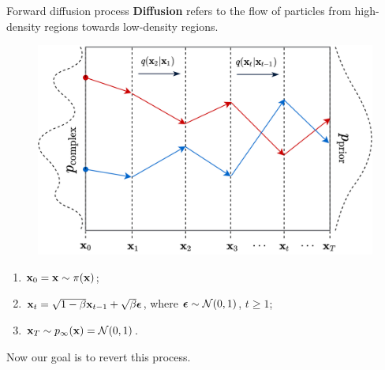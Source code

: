 \begin{frame}{Forward diffusion process}
	\textbf{Diffusion} refers to the flow of particles from high-density regions towards low-density regions.
	\begin{figure}
		\includegraphics[width=0.5\linewidth]{figs/diffusion_over_time}
	\end{figure}
	\vspace{-0.3cm}
	\begin{enumerate}
		\item $\mathbf{x}_0 = \mathbf{x} \sim \pi(\mathbf{x})$;
		\item $\mathbf{x}_t = \sqrt{1 - \beta} \mathbf{x}_{t - 1} + \sqrt{\beta} \boldsymbol{\epsilon}$, where $\boldsymbol{\epsilon} \sim \mathcal{N}(0, 1)$, $t \geq 1$;
		\item $\mathbf{x}_T \sim p_{\infty}(\mathbf{x}) = \mathcal{N}(0, 1)$.
	\end{enumerate}
	Now our goal is to revert this process.
\end{frame}
